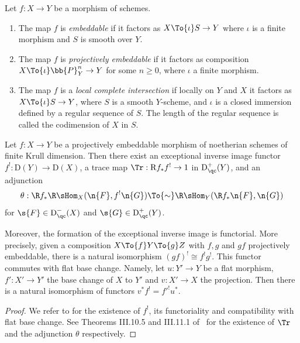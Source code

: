 \begin{definition}
Let $f:X\to Y$ be a morphism of schemes.
\begin{enumerate}
\item The map $f$ is \textit{embeddable} if it factors as $X\To{\iota} S \to Y $ where $\iota$ is a finite morphism and $S$ is smooth over $Y$.
\item The map $f$ is \textit{projectively embeddable} if it factors as composition \hbox{$ X\To{\iota} \bb{P}^n_Y\to Y$} for some $n\geq 0$, where $\iota$ a finite morphism.

\item The map $f$ is a \textit{local complete intersection} if locally on $Y$ and $X$ it factors as $X\To{\iota} S \to Y $, where $S$ is a smooth $Y$-scheme, and $\iota$ is a closed immersion defined by a regular sequence of $S$. The length of the regular sequence is called the codimension of $X$ in $S$.
\end{enumerate}
\end{definition}

\begin{theo}[Hartshorne]
\label{GrothSerreDuality}

Let $f: X\to Y$ be a projectively embeddable morphism of noetherian schemes of finite Krull dimension. Then there exist an exceptional inverse image functor $f^!: \mathrm{D}(Y)\to \mathrm{D}(X)$, a trace map $\Tr: \mathrm{R}f_*f^!\to 1$ in $\mathrm{D}^+_{\qc}(Y)$, and an adjunction
\[
\theta: \R f_* \R \sHom_{X}(\n{F}, f^! \n{G}) \To{\sim} \R\sHom_Y(\R f_* \n{F}, \n{G})
\]
for $\s{F}\in \mathrm{D}^-_{\qc}(X)$ and $\s{G}\in \mathrm{D}^+_{\qc}(Y)$.

Moreover, the formation of the exceptional inverse image is functorial. More precisely, given a composition $X\To{f} Y \To{g} Z$ with $f,g$ and $gf$ projectively embeddable, there is a natural isomorphism $(gf)^!\cong f^!g^!$. This functor commutes with flat base change. Namely, let $u:Y'\to Y$ be a flat morphism, $f':X'\to Y'$ the base change of $X$ to $Y'$ and $v: X'\to X$ the projection. Then there is a natural isomorphism of functors $v^*f^!={f'}^! u^*$.
\end{theo}

\begin{proof}
We refer to \cite[Th.\,III.8.7]{hartshorne1966residues} for the existence of $f^!$, its functoriality and compatibility with flat base change. See Theorems III.10.5 and III.11.1 of \loccit\ for the existence of $\Tr$ and the adjunction $\theta$ respectively.
\end{proof}

